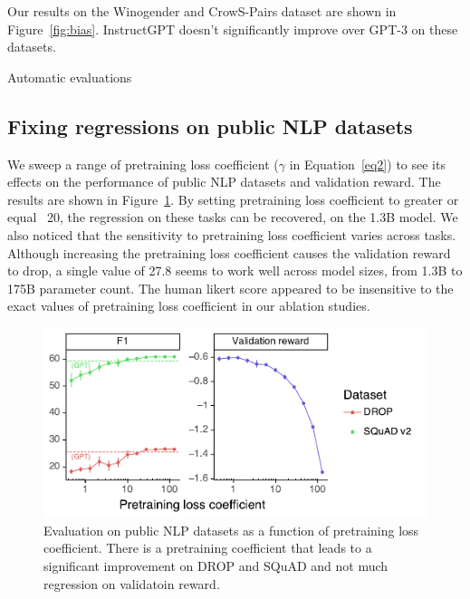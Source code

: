 \documentclass{article}
\begin{document}
Our results on the Winogender and CrowS-Pairs dataset are shown in Figure~\ref{fig:bias}. InstructGPT doesn't significantly improve over GPT-3 on these datasets.



\begin{table}[t]
    \centering
    \caption{Automatic evaluations}
    \label{tab:autoevals}
    \tiny
    
\end{table}






 
\subsection{Fixing regressions on public NLP datasets}

We sweep a range of pretraining loss coefficient ($\gamma$ in Equation~\ref{eq2}) to see its effects on the performance of public NLP datasets and validation reward. The results are shown in Figure~\ref{fig:public-nlp-evals-v-pretrain}. By setting pretraining loss coefficient to greater or equal ~20, the regression on these tasks can be recovered, on the 1.3B model. We also noticed that the sensitivity to pretraining loss coefficient varies across tasks. Although increasing the pretraining loss coefficient causes the validation reward to drop, a single value of 27.8 seems to work well across model sizes, from 1.3B to 175B parameter count. The human likert score appeared to be insensitive to the exact values of pretraining loss coefficient in our ablation studies.

\begin{figure}
    \centering
    \includegraphics[width=\linewidth]{figs/academic-evals-v-pretrain-loss.pdf}
    \caption{Evaluation on public NLP datasets as a function of pretraining loss coefficient. There is a pretraining coefficient that leads to a significant improvement on DROP and SQuAD and not much regression on validatoin reward.}
    \label{fig:public-nlp-evals-v-pretrain}
\end{figure}
\end{document}

